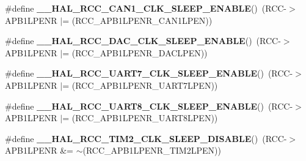 \begin{DoxyCompactItemize}
\item 
\mbox{\label{group___r_c_c_ex___peripheral___clock___sleep___enable___disable_ga60947e98578d8436243e286349cbbd4c}} 
\#define {\bfseries \+\_\+\+\_\+\+H\+A\+L\+\_\+\+R\+C\+C\+\_\+\+C\+A\+N1\+\_\+\+C\+L\+K\+\_\+\+S\+L\+E\+E\+P\+\_\+\+E\+N\+A\+B\+LE}()~(R\+CC-\/$>$A\+P\+B1\+L\+P\+E\+NR $\vert$= (R\+C\+C\+\_\+\+A\+P\+B1\+L\+P\+E\+N\+R\+\_\+\+C\+A\+N1\+L\+P\+EN))
\item 
\mbox{\label{group___r_c_c_ex___peripheral___clock___sleep___enable___disable_gad50feef6d1bdd1d254d96ce2786a502b}} 
\#define {\bfseries \+\_\+\+\_\+\+H\+A\+L\+\_\+\+R\+C\+C\+\_\+\+D\+A\+C\+\_\+\+C\+L\+K\+\_\+\+S\+L\+E\+E\+P\+\_\+\+E\+N\+A\+B\+LE}()~(R\+CC-\/$>$A\+P\+B1\+L\+P\+E\+NR $\vert$= (R\+C\+C\+\_\+\+A\+P\+B1\+L\+P\+E\+N\+R\+\_\+\+D\+A\+C\+L\+P\+EN))
\item 
\mbox{\label{group___r_c_c_ex___peripheral___clock___sleep___enable___disable_ga619f901afe8c514f0782a0ab22465519}} 
\#define {\bfseries \+\_\+\+\_\+\+H\+A\+L\+\_\+\+R\+C\+C\+\_\+\+U\+A\+R\+T7\+\_\+\+C\+L\+K\+\_\+\+S\+L\+E\+E\+P\+\_\+\+E\+N\+A\+B\+LE}()~(R\+CC-\/$>$A\+P\+B1\+L\+P\+E\+NR $\vert$= (R\+C\+C\+\_\+\+A\+P\+B1\+L\+P\+E\+N\+R\+\_\+\+U\+A\+R\+T7\+L\+P\+EN))
\item 
\mbox{\label{group___r_c_c_ex___peripheral___clock___sleep___enable___disable_ga649a26c04fcad09ba3597c8829f8e9eb}} 
\#define {\bfseries \+\_\+\+\_\+\+H\+A\+L\+\_\+\+R\+C\+C\+\_\+\+U\+A\+R\+T8\+\_\+\+C\+L\+K\+\_\+\+S\+L\+E\+E\+P\+\_\+\+E\+N\+A\+B\+LE}()~(R\+CC-\/$>$A\+P\+B1\+L\+P\+E\+NR $\vert$= (R\+C\+C\+\_\+\+A\+P\+B1\+L\+P\+E\+N\+R\+\_\+\+U\+A\+R\+T8\+L\+P\+EN))
\item 
\mbox{\label{group___r_c_c_ex___peripheral___clock___sleep___enable___disable_ga65aef0935a6eb3e1ee17e9d19ec6ee8e}} 
\#define {\bfseries \+\_\+\+\_\+\+H\+A\+L\+\_\+\+R\+C\+C\+\_\+\+T\+I\+M2\+\_\+\+C\+L\+K\+\_\+\+S\+L\+E\+E\+P\+\_\+\+D\+I\+S\+A\+B\+LE}()~(R\+CC-\/$>$A\+P\+B1\+L\+P\+E\+NR \&= $\sim$(R\+C\+C\+\_\+\+A\+P\+B1\+L\+P\+E\+N\+R\+\_\+\+T\+I\+M2\+L\+P\+EN))

\end{DoxyCompactItemize}

